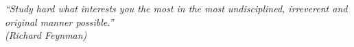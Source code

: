 \begin{epigrafe}
    \vspace*{\fill}
	\begin{flushright}
		\textit{“Study hard what interests you the most in the most undisciplined, irreverent and original manner possible.”  \\
        (Richard Feynman)}
	\end{flushright}
\end{epigrafe}